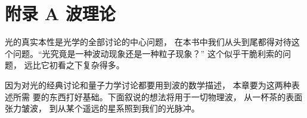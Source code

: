 \documentclass[UTF8]{report}
\theoremstyle{MyLineTheoremStyle} %
\theoremstyle{MyBlockTheoremStyle} %
\theoremstyle{MySubsubsectionStyle} %
\begin{document}
\nocite{*}

\thispagestyle{fancy} 























\newpage
\appendix
\titleformat{\chapter}[hang]{\normalfont\huge\bfseries\centering}{}{20pt}{}
\titlespacing*{\chapter}{0pt}{-25pt}{8pt} %
\titleformat{\section}[hang]{\normalfont\centering\Large\bfseries}{\thesection}{8pt}{}

\chapter*{附录 A\hspace*{20pt} 波理论}
\setcounter{chapter}{1}   
\setcounter{equation}{0}    %
\thispagestyle{fancy} 
\setcounter{section}{0}
\renewcommand\thesection{A.\arabic{section}}   
\renewcommand{\thefigure}{A.\arabic{figure}} 
\renewcommand{\thetable}{A.\arabic{table}}


光的真实本性是光学的全部讨论的中心问题， 在本书中我们从头到尾都得对待这个问题。“光究竟是一种波动现象还是一种粒子现象？” 这个似乎干脆利索的问题， 远比它初看之下复杂得多。

因为对光的经典讨论和量子力学讨论都要用到波的数学描述， 本章要为这两种表述所需
要的东西打好基础。下面叙说的想法将用于一切物理波， 从一杯茶的表面张力皱波， 到从某个遥远的星系照到我们的光脉冲。
\end{document}
